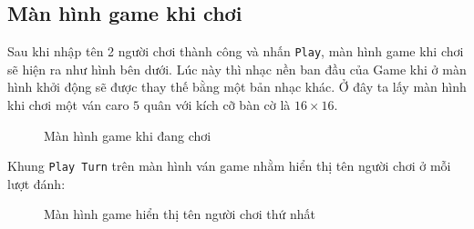 \subsection{Màn hình game khi chơi}
Sau khi nhập tên 2 người chơi thành công và nhấn \verb|Play|, màn hình game khi chơi sẽ hiện ra như hình bên dưới. Lúc này thì nhạc nền ban đầu của Game khi ở màn hình khởi động sẽ được thay thế bằng một bản nhạc khác. Ở đây ta lấy màn hình khi chơi một ván caro \(5\) quân với kích cỡ bàn cờ là \(16 \times 16\).
\begin{figure}[H]
\caption{Màn hình game khi đang chơi}
\end{figure}
Khung \verb|Play Turn| trên màn hình ván game nhằm hiển thị tên người chơi ở mỗi lượt đánh:
\begin{figure}[H]
\caption{Màn hình game hiển thị tên người chơi thứ nhất}
\end{figure}
